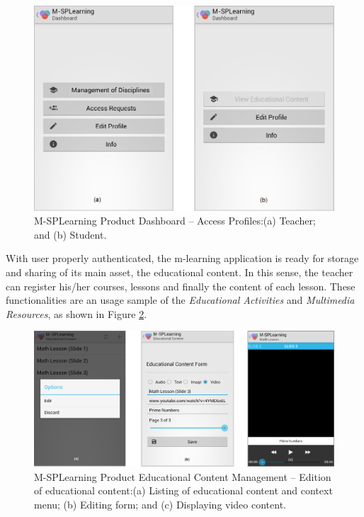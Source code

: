\begin{figure}[!ht]
\centering
\includegraphics[scale=0.35]{figures/section3/MSPLDashboardApp}
\caption{M-SPLearning Product Dashboard -- Access Profiles:\newline(a) Teacher; and (b) Student.}
\label{figureMSPLDashboardApp}
\end{figure}

With user properly authenticated, the m-learning application is ready for storage and sharing of its main asset, the educational content. In this sense, the teacher can register his/her courses, lessons and finally the content of each lesson. These functionalities are an usage sample of the \textit{Educational Activities} and \textit{Multimedia Resources}, as shown in Figure \ref{figureMSPLEducationalContent}.

\begin{figure}[!ht]
\centering
\includegraphics[scale=0.35]{figures/section3/MSPLEducationalContent}
\caption{M-SPLearning Product Educational Content Management -- Edition of educational content:\newline(a) Listing of educational content and context menu; (b) Editing form; and (c) Displaying video content.}
\label{figureMSPLEducationalContent}
\end{figure}

